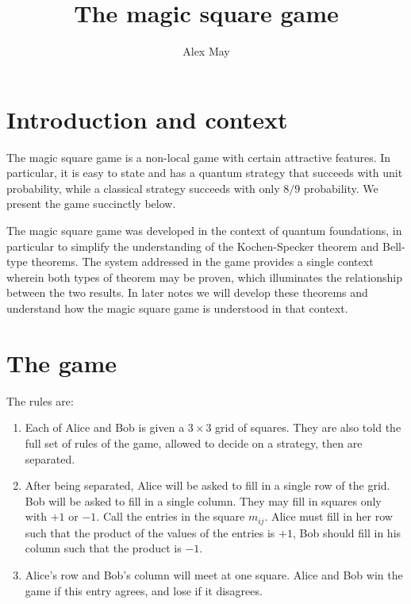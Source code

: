 \documentclass[a4paper,11pt]{article}
\title{The magic square game}
\author[a]{Alex May}
\affiliation[a]{The University of British Columbia}
\begin{document}
 

\maketitle

\section{Introduction and context}

The magic square game is a non-local game with certain attractive features. In particular, it is easy to state and has a quantum strategy that succeeds with unit probability, while a classical strategy succeeds with only $8/9$ probability. We present the game succinctly below. 

The magic square game was developed in the context of quantum foundations, in particular to simplify the understanding of the Kochen-Specker theorem and Bell-type theorems. The system addressed in the game provides a single context wherein both types of theorem may be proven, which illuminates the relationship between the two results. In later notes we will develop these theorems and understand how the magic square game is understood in that context. 

\section{The game}

The rules are:
\begin{enumerate}
    \item Each of Alice and Bob is given a $3\times 3$ grid of squares. They are also told the full set of rules of the game, allowed to decide on a strategy, then are separated. 
    \item After being separated, Alice will be asked to fill in a single row of the grid. Bob will be asked to fill in a single column. They may fill in squares only with $+1$ or $-1$. Call the entries in the square $m_{ij}$. Alice must fill in her row such that the product of the values of the entries is $+1$, Bob should fill in his column such that the product is $-1$. 
    \item Alice's row and Bob's column will meet at one square. Alice and Bob win the game if this entry agrees, and lose if it disagrees. 
\end{enumerate}
\end{document}

